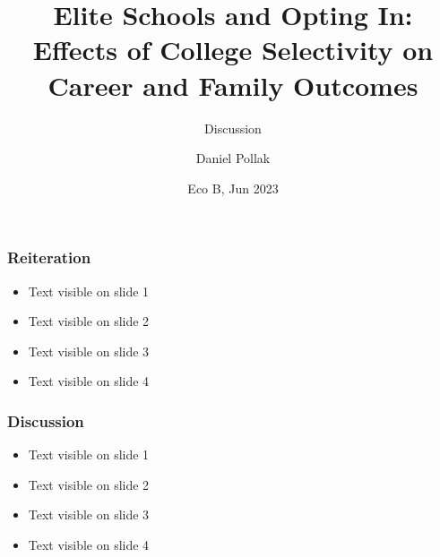 \documentclass{beamer}
\title[Eco B] %
{Elite Schools and Opting In: Effects of College Selectivity on Career and Family Outcomes}
\subtitle{Discussion}
\author %
{Daniel Pollak}
\institute[VFU] %
{
  Tel-Aviv University
}
\date %
{Eco B, Jun 2023}
\begin{document}
\frame{\titlepage}

\begin{frame}
\frametitle{Reiteration}
\begin{itemize}
\item<1-> Text visible on slide 1
\item<1-> Text visible on slide 2
\item<1-> Text visible on slide 3
\item<1-> Text visible on slide 4
\end{itemize}
\end{frame}

\begin{frame}
\frametitle{Discussion}
\begin{itemize}
\item<1-> Text visible on slide 1
\item<1-> Text visible on slide 2
\item<1-> Text visible on slide 3
\item<1-> Text visible on slide 4
\end{itemize}
\end{frame}
\end{document}
